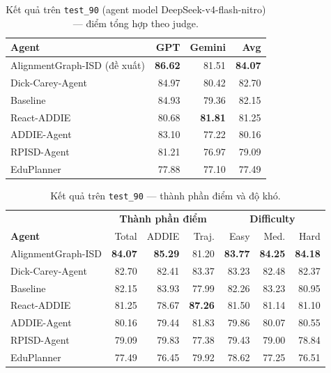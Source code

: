 \documentclass[../main.tex]{subfiles}
\begin{document}
\begin{table}[H]
\centering
\small
\caption{Kết quả trên \texttt{test\_90} (agent model DeepSeek-v4-flash-nitro) --- điểm tổng hợp theo judge.}
\label{tab:test90}
\begin{tabular}{lrrr}
\hline
\textbf{Agent} & \textbf{GPT} & \textbf{Gemini} & \textbf{Avg} \\
\hline
AlignmentGraph-ISD (đề xuất) & \textbf{86.62} & 81.51 & \textbf{84.07} \\
Dick-Carey-Agent & 84.97 & 80.42 & 82.70 \\
Baseline & 84.93 & 79.36 & 82.15 \\
React-ADDIE & 80.68 & \textbf{81.81} & 81.25 \\
ADDIE-Agent & 83.10 & 77.22 & 80.16 \\
RPISD-Agent & 81.21 & 76.97 & 79.09 \\
EduPlanner & 77.88 & 77.10 & 77.49 \\
\hline
\end{tabular}
\end{table}

\begin{table}[H]
\centering
\small
\caption{Kết quả trên \texttt{test\_90} --- thành phần điểm và độ khó.}
\label{tab:test90-components}
\begin{tabular}{lrrrrrr}
\hline
& \multicolumn{3}{c}{\textbf{Thành phần điểm}} & \multicolumn{3}{c}{\textbf{Difficulty}} \\
\textbf{Agent} & Total & ADDIE & Traj. & Easy & Med. & Hard \\
\hline
AlignmentGraph-ISD & \textbf{84.07} & \textbf{85.29} & 81.20 & \textbf{83.77} & \textbf{84.25} & \textbf{84.18} \\
Dick-Carey-Agent & 82.70 & 82.41 & 83.37 & 83.23 & 82.48 & 82.37 \\
Baseline & 82.15 & 83.93 & 77.99 & 82.26 & 83.23 & 80.95 \\
React-ADDIE & 81.25 & 78.67 & \textbf{87.26} & 81.50 & 81.14 & 81.10 \\
ADDIE-Agent & 80.16 & 79.44 & 81.83 & 79.86 & 80.07 & 80.55 \\
RPISD-Agent & 79.09 & 79.83 & 77.38 & 79.43 & 79.00 & 78.84 \\
EduPlanner & 77.49 & 76.45 & 79.92 & 78.62 & 77.25 & 76.51 \\
\hline
\end{tabular}
\end{table}
\end{document}
